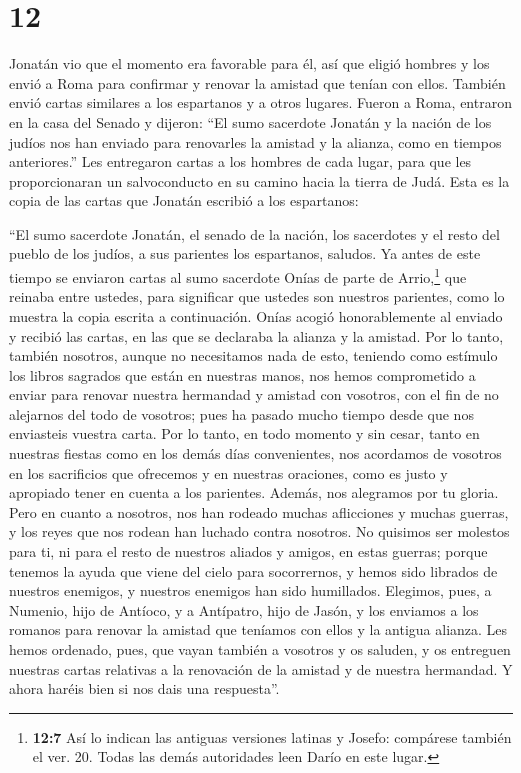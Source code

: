 \hypertarget{section-11}{%
\section{12}\label{section-11}}

 Jonatán vio que el momento era favorable para él, así que
eligió hombres y los envió a Roma para confirmar y renovar la amistad
que tenían con ellos.  También envió cartas similares a
los espartanos y a otros lugares.  Fueron a Roma, entraron
en la casa del Senado y dijeron: ``El sumo sacerdote Jonatán y la nación
de los judíos nos han enviado para renovarles la amistad y la alianza,
como en tiempos anteriores.''  Les entregaron cartas a los
hombres de cada lugar, para que les proporcionaran un salvoconducto en
su camino hacia la tierra de Judá.  Esta es la copia de
las cartas que Jonatán escribió a los espartanos:

 ``El sumo sacerdote Jonatán, el senado de la nación, los
sacerdotes y el resto del pueblo de los judíos, a sus parientes los
espartanos, saludos.  Ya antes de este tiempo se enviaron
cartas al sumo sacerdote Onías de parte de Arrio,\footnote{\textbf{12:7}
  Así lo indican las antiguas versiones latinas y Josefo: compárese
  también el ver. 20. Todas las demás autoridades leen Darío en este
  lugar.} que reinaba entre ustedes, para significar que ustedes son
nuestros parientes, como lo muestra la copia escrita a continuación.
 Onías acogió honorablemente al enviado y recibió las
cartas, en las que se declaraba la alianza y la amistad. 
Por lo tanto, también nosotros, aunque no necesitamos nada de esto,
teniendo como estímulo los libros sagrados que están en nuestras manos,
 nos hemos comprometido a enviar para renovar nuestra
hermandad y amistad con vosotros, con el fin de no alejarnos del todo de
vosotros; pues ha pasado mucho tiempo desde que nos enviasteis vuestra
carta.  Por lo tanto, en todo momento y sin cesar, tanto
en nuestras fiestas como en los demás días convenientes, nos acordamos
de vosotros en los sacrificios que ofrecemos y en nuestras oraciones,
como es justo y apropiado tener en cuenta a los parientes.
 Además, nos alegramos por tu gloria. 
Pero en cuanto a nosotros, nos han rodeado muchas aflicciones y muchas
guerras, y los reyes que nos rodean han luchado contra nosotros.
 No quisimos ser molestos para ti, ni para el resto de
nuestros aliados y amigos, en estas guerras;  porque
tenemos la ayuda que viene del cielo para socorrernos, y hemos sido
librados de nuestros enemigos, y nuestros enemigos han sido humillados.
 Elegimos, pues, a Numenio, hijo de Antíoco, y a
Antípatro, hijo de Jasón, y los enviamos a los romanos para renovar la
amistad que teníamos con ellos y la antigua alianza.  Les
hemos ordenado, pues, que vayan también a vosotros y os saluden, y os
entreguen nuestras cartas relativas a la renovación de la amistad y de
nuestra hermandad.  Y ahora haréis bien si nos dais una
respuesta''.

